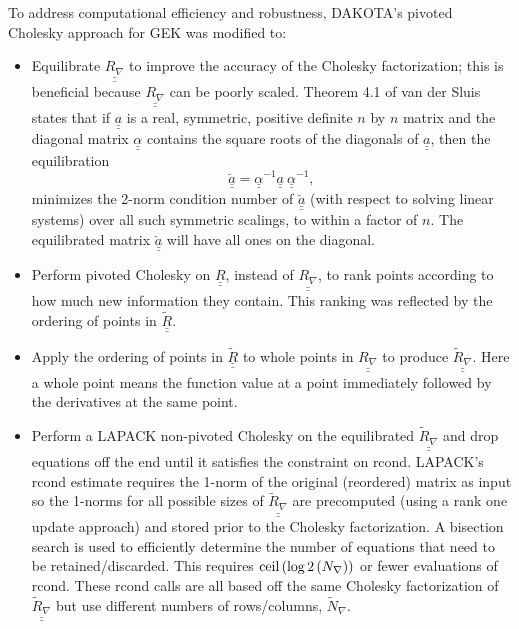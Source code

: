 To address computational efficiency and robustness, DAKOTA's pivoted
Cholesky approach for GEK was modified to: 
\begin{itemize}
\item Equilibrate $\underline{\underline{R_{\nabla}}}$ to improve 
      the accuracy of the Cholesky factorization; this is beneficial
      because $\underline{\underline{R_{\nabla}}}$ can be poorly 
      scaled. Theorem 4.1 of 
      van der Sluis \cite{Van69} states that if
      $\underline{\underline{a}}$ is a real, symmetric, positive 
      definite $n$ by $n$ matrix and the diagonal matrix 
      $\underline{\underline{\alpha}}$ contains the square roots of the 
      diagonals of $\underline{\underline{a}}$, then the equilibration
      \begin{displaymath}
        \underline{\underline{\breve{a}}}=\underline{\underline{\alpha}}^{-1}\underline{\underline{a}}\ \underline{\underline{\alpha}}^{-1},
      \end{displaymath}
      minimizes the 2-norm condition number of 
      $\underline{\underline{\breve{a}}}$ (with respect to solving linear 
      systems) over all such symmetric scalings, to within a factor of $n$.
      The equilibrated matrix $\underline{\underline{\breve{a}}}$ will 
      have all ones on the diagonal.
\item Perform pivoted Cholesky on $\underline{\underline{R}}$,
      instead of $\underline{\underline{R_{\nabla}}}$, to rank points 
      according to how much new information they contain.  This 
      ranking was reflected by the ordering of points in 
      $\underline{\underline{\tilde{R}}}$.
\item Apply the ordering of points in $\underline{\underline{\tilde{R}}}$
      to whole points in $\underline{\underline{R_{\nabla}}}$ to produce
      $\underline{\underline{\tilde{R}_{\nabla}}}$.  Here a whole point
      means the function value at a point immediately followed by the 
      derivatives at the same point.
\item Perform a LAPACK non-pivoted Cholesky on the equilibrated   
      $\underline{\underline{\tilde{R}_{\nabla}}}$ and drop equations off 
      the end until it satisfies the constraint on rcond.  LAPACK's rcond 
      estimate requires the 1-norm of the original (reordered) matrix as 
      input so the 1-norms for all possible sizes of 
      $\underline{\underline{\tilde{R}_{\nabla}}}$ are precomputed (using 
      a rank one update approach) and stored prior to the Cholesky 
      factorization.  A bisection search is used to efficiently determine 
      the number of equations that need to be retained/discarded. This
      requires ${\rm ceil}\left(\log2\left(N_{\nabla}\right)\right)$ or
      fewer evaluations of rcond.  These rcond calls are all based off the same
      Cholesky factorization of $\underline{\underline{\tilde{R}_{\nabla}}}$
      but use different numbers of rows/columns, $\tilde{N}_{\nabla}$.
\end{itemize}
